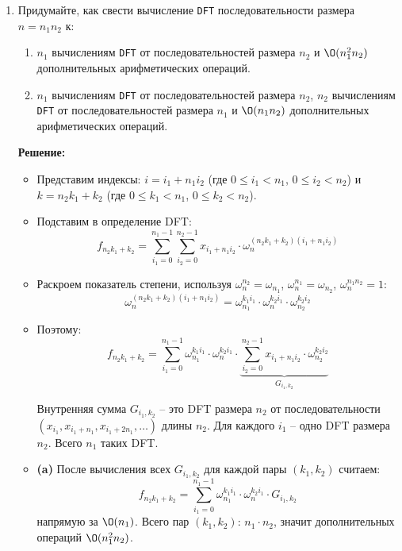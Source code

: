 \begin{enumerate}
\begin{enumerate}
\begin{itemize}
          \item Итого: $\O(p \log p)$ арифметических операций.
        \end{itemize}
    \end{enumerate}

  \item
    Придумайте, как свести вычисление \texttt{DFT} последовательности размера $n = n_1 n_2$ к:
    \begin{enumerate}
      \item
        $n_1$ вычислениям \texttt{DFT} от последовательностей размера $n_2$ и
        $\O(n_1^2 n_2)$ дополнительных арифметических операций.
      \item
        $n_1$ вычислениям \texttt{DFT} от последовательностей размера $n_2$,
        $n_2$ вычислениям \texttt{DFT} от последовательностей размера $n_1$ и
        $\O(n_1 n_2)$ дополнительных арифметических операций.
    \end{enumerate}

    \textbf{Решение:}

    \begin{itemize}
      \item Представим индексы: $i = i_1 + n_1 i_2$ (где $0 \leq i_1 < n_1$, $0 \leq i_2 < n_2$) и $k = n_2 k_1 + k_2$ (где $0 \leq k_1 < n_1$, $0 \leq k_2 < n_2$).

      \item Подставим в определение DFT:
      $$f_{n_2 k_1 + k_2} = \sum_{i_1=0}^{n_1-1}\sum_{i_2=0}^{n_2-1} x_{i_1 + n_1 i_2} \cdot \omega_n^{(n_2 k_1 + k_2)(i_1 + n_1 i_2)}$$

      \item Раскроем показатель степени, используя $\omega_n^{n_2} = \omega_{n_1}$, $\omega_n^{n_1} = \omega_{n_2}$, $\omega_n^{n_1 n_2} = 1$:
      $$\omega_n^{(n_2 k_1 + k_2)(i_1 + n_1 i_2)} = \omega_{n_1}^{k_1 i_1} \cdot \omega_n^{k_2 i_1} \cdot \omega_{n_2}^{k_2 i_2}$$

      \item Поэтому:
      $$f_{n_2 k_1 + k_2} = \sum_{i_1=0}^{n_1-1} \omega_{n_1}^{k_1 i_1} \cdot \omega_n^{k_2 i_1} \cdot \underbrace{\sum_{i_2=0}^{n_2-1} x_{i_1 + n_1 i_2} \cdot \omega_{n_2}^{k_2 i_2}}_{G_{i_1, k_2}}$$

      Внутренняя сумма $G_{i_1, k_2}$ -- это DFT размера $n_2$ от последовательности $(x_{i_1}, x_{i_1 + n_1}, x_{i_1 + 2n_1}, \ldots)$ длины $n_2$. Для каждого $i_1$ -- одно DFT размера $n_2$. Всего $n_1$ таких DFT.

      \item \textbf{(a)} После вычисления всех $G_{i_1, k_2}$ для каждой пары $(k_1, k_2)$ считаем:
      $$f_{n_2 k_1 + k_2} = \sum_{i_1=0}^{n_1-1} \omega_{n_1}^{k_1 i_1} \cdot \omega_n^{k_2 i_1} \cdot G_{i_1, k_2}$$
      напрямую за $\O(n_1)$. Всего пар $(k_1, k_2)$: $n_1 \cdot n_2$, значит дополнительных операций $\O(n_1^2 n_2)$.


\end{itemize}
\end{enumerate}
